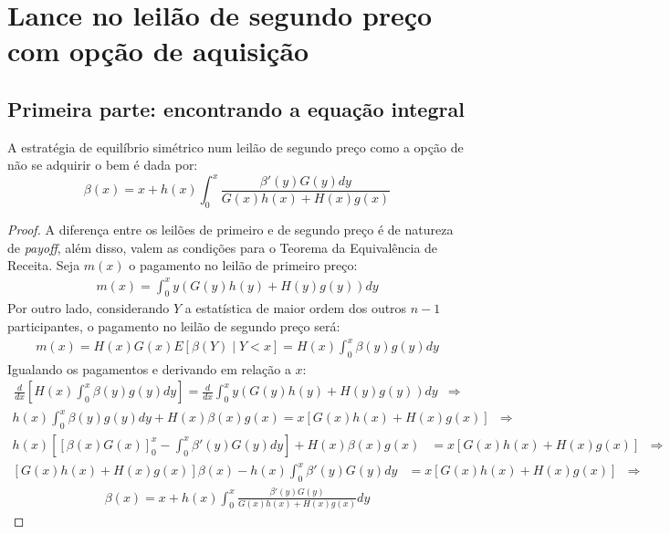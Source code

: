\section{Lance no leilão de segundo preço com opção de aquisição}

\subsection{Primeira parte: encontrando a equação integral}
\begin{lema}
	A estratégia de equilíbrio simétrico num leilão de segundo preço como a opção de não se adquirir o bem é dada por:
	\begin{equation}
		\beta(x) = x + h(x)\int_0^x \frac{\beta'(y)G(y)dy}{G(x)h(x) + H(x)g(x)}
	\end{equation}
\end{lema}
\begin{proof}
	A diferença entre os leilões de primeiro e de segundo preço é de natureza de \emph{payoff}, além disso, valem as condições para o Teorema da Equivalência de Receita.
	Seja $m(x)$ o pagamento no leilão de primeiro preço:
	\begin{align*}
		m(x) = \int_0^x y(G(y)h(y)+H(y)g(y)) dy
	\end{align*}
	Por outro lado, considerando $Y$ a estatística de maior ordem dos outros $n-1$ participantes, o pagamento no leilão de segundo preço será:
	\begin{align*}
		m(x) = H(x)G(x)E[\beta(Y) \mid Y<x] = H(x) \int_0^x \beta(y)g(y)dy
	\end{align*}
	Igualando os pagamentos e derivando em relação a $x$:
	\begin{align*}
		\frac{d}{dx} \left[ H(x) \int_0^x \beta(y)g(y)dy \right] = \frac{d}{dx} \int_0^x y(G(y)h(y)+H(y)g(y)) dy & \Rightarrow
	\end{align*}
	\begin{align*}
		h(x) \int_0^x \beta(y)g(y)dy + H(x)\beta(x)g(x) = x\left[ G(x)h(x) + H(x)g(x) \right] & \Rightarrow
	\end{align*}
	\begin{align*}
		h(x) \left[ \left[ \beta(x)G(x) \right]_0^x - \int_0^x \beta'(y)G(y)dy \right] + H(x)\beta(x)g(x) & = x\left[ G(x)h(x) + H(x)g(x) \right] & \Rightarrow
	\end{align*}
	\begin{align*}
		\left[ G(x)h(x) + H(x)g(x) \right]\beta(x) - h(x) \int_0^x \beta'(y)G(y)dy & = x\left[ G(x)h(x) + H(x)g(x) \right] & \Rightarrow
	\end{align*}
	\begin{align*}
		\beta(x) = x + h(x) \int_0^x \frac{\beta'(y)G(y)}{G(x)h(x) + H(x)g(x)}dy
	\end{align*}
\end{proof}

